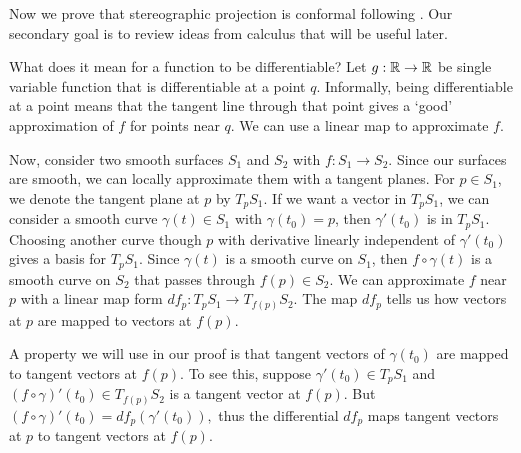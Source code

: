 Now we prove that stereographic projection is conformal following \cite{hilbert-imagination}.
Our secondary goal is to review ideas from calculus that will be useful later.

What does it mean for a function to be differentiable? Let $g:\mathbb{R}\rightarrow \mathbb{R}$ be single variable function that is differentiable at a point $q$. Informally, being differentiable at a point means that the tangent
line through that point gives a `good' approximation of $f$ for points near $q$. We can use a linear map to approximate $f$. 

Now, consider two smooth surfaces $S_1$ and $S_2$ with $f:S_1\rightarrow S_2.$ Since our
surfaces are smooth, we can locally approximate them with a tangent planes. 
For $p\in S_1$, we denote the tangent plane at $p$ by $T_pS_1.$ If we want a vector in $T_pS_1$,
we can consider a smooth curve $\gamma(t)\in S_1$ with $\gamma(t_0)=p$, then $\gamma'(t_0)$ 
is in $T_pS_1.$ Choosing another curve though $p$ with derivative linearly independent of $\gamma'(t_0)$
gives a basis for $T_pS_1$.
Since $\gamma(t)$ is a smooth curve on $S_1$, then $f\circ \gamma(t)$ is a smooth curve
on $S_2$ that passes through $f(p)\in S_2.$
We can approximate $f$ near $p$ with a linear map form $df_p:T_pS_1\rightarrow T_{f(p)}S_2.$
The map $df_p$ tells us how vectors at $p$ are mapped to vectors at $f(p).$

A property we will use in our proof is that tangent vectors of $\gamma(t_0)$ are mapped
to tangent vectors at $f(p)$. To see this, suppose $\gamma'(t_0)\in T_pS_1$ and
$(f\circ \gamma)'(t_0)\in T_{f(p)}S_2$ is a tangent vector at $f(p)$. But
$(f\circ \gamma)'(t_0)=df_p(\gamma'(t_0)),$ thus the differential $df_p$ maps
tangent vectors at $p$ to tangent vectors at $f(p).$




